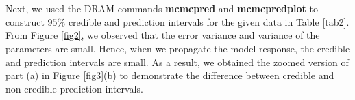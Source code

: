\documentclass[11pt]{article}
\begin{document}
\begin{enumerate}
\begin{figure*}[!htb]
\centering
   \\
         \\
\caption{Densities for (a) $\Phi$; (b) $h$; (c) $\varepsilon$}
\label{fig2}
\end{figure*}
Next, we used the DRAM commands {\bf mcmcpred} and {\bf mcmcpredplot} to construct $95\%$ credible and prediction intervals for the given data in Table \ref{tab2}. From Figure \ref{fig2}, we observed that the error variance and variance of the parameters are small. Hence, when we propagate the model response, the credible and prediction intervals are small. As a result, we obtained the zoomed version of part (a) in Figure \ref{fig3}(b) to demonstrate the difference between credible and non-credible prediction intervals.
\begin{figure*}[!hbt]
\caption{(a) Data, $95\%$ credible and prediction interval using data in Table \ref{tab2}; (b) Reduced x-axis to illustrate the difference of credible and prediction interval.}
\label{fig3}
\end{figure*}


\end{enumerate}
\end{document}
